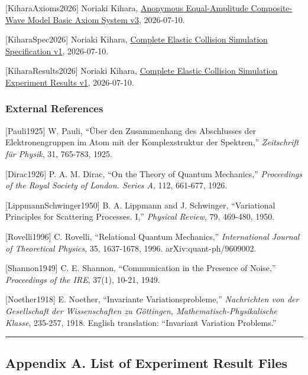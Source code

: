\documentclass[
  a4paper,
]{article}
\begin{document}
{[}KiharaAxioms2026{]} Noriaki Kihara,
\href{basic_axiom_system_v3_en.md}{Anonymous Equal-Amplitude
Composite-Wave Model Basic Axiom System v3}, 2026-07-10.

{[}KiharaSpec2026{]} Noriaki Kihara,
\href{elastic_collision_simulation_spec_v1_en.md}{Complete Elastic
Collision Simulation Specification v1}, 2026-07-10.

{[}KiharaResults2026{]} Noriaki Kihara,
\href{elastic_collision_simulation_experiment_results_v1_en.md}{Complete
Elastic Collision Simulation Experiment Results v1}, 2026-07-10.

\subsubsection{External References}\label{external-references}

{[}Pauli1925{]} W. Pauli, ``Über den Zusammenhang des Abschlusses der
Elektronengruppen im Atom mit der Komplexstruktur der Spektren,''
\emph{Zeitschrift für Physik}, 31, 765-783, 1925.

{[}Dirac1926{]} P. A. M. Dirac, ``On the Theory of Quantum Mechanics,''
\emph{Proceedings of the Royal Society of London. Series A}, 112,
661-677, 1926.

{[}LippmannSchwinger1950{]} B. A. Lippmann and J. Schwinger,
``Variational Principles for Scattering Processes. I,'' \emph{Physical
Review}, 79, 469-480, 1950.

{[}Rovelli1996{]} C. Rovelli, ``Relational Quantum Mechanics,''
\emph{International Journal of Theoretical Physics}, 35, 1637-1678,
1996. arXiv:quant-ph/9609002.

{[}Shannon1949{]} C. E. Shannon, ``Communication in the Presence of
Noise,'' \emph{Proceedings of the IRE}, 37(1), 10-21, 1949.

{[}Noether1918{]} E. Noether, ``Invariante Variationsprobleme,''
\emph{Nachrichten von der Gesellschaft der Wissenschaften zu Göttingen,
Mathematisch-Physikalische Klasse}, 235-257, 1918. English translation:
``Invariant Variation Problems.''

\begin{center}\rule{0.5\linewidth}{0.5pt}\end{center}

\subsection{Appendix A. List of Experiment Result
Files}\label{appendix-a.-list-of-experiment-result-files}
\end{document}
